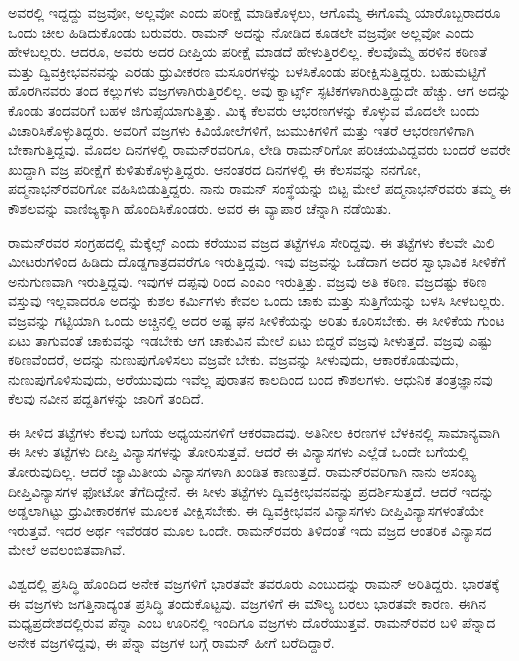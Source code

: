 ಅವರಲ್ಲಿ ಇದ್ದದ್ದು ವಜ್ರವೋ, ಅಲ್ಲವೋ ಎಂದು ಪರೀಕ್ಷೆ ಮಾಡಿಕೊಳ್ಳಲು, ಆಗೊಮ್ಮೆ ಈಗೊಮ್ಮೆ ಯಾರೊಬ್ಬರಾದರೂ ಒಂದು ಚೀಲ ಹಿಡಿದುಕೊಂಡು ಬರುವರು. ರಾಮನ್ ಅದನ್ನು ನೋಡಿದ ಕೂಡಲೇ ವಜ್ರವೋ ಅಲ್ಲವೋ ಎಂದು ಹೇಳಬಲ್ಲರು. ಆದರೂ, ಅವರು ಅದರ ದೀಪ್ತಿಯ ಪರೀಕ್ಷೆ ಮಾಡದೆ ಹೇಳುತ್ತಿರಲಿಲ್ಲ. ಕೆಲವೊಮ್ಮೆ ಹರಳಿನ ಕಠಿಣತೆ ಮತ್ತು ದ್ವಿವಕ್ರೀಭವನವನ್ನು ಎರಡು ಧ್ರುವೀಕರಣ ಮಸೂರಗಳನ್ನು ಬಳಸಿಕೊಂಡು ಪರೀಕ್ಷಿಸುತ್ತಿದ್ದರು. ಬಹುಮಟ್ಟಿಗೆ ಹೊರಗಿನವರು ತಂದ ಕಲ್ಲುಗಳು ವಜ್ರಗಳಾಗಿರುತ್ತಿರಲಿಲ್ಲ. ಅವು ಕ್ವಾರ್ಟ್ಸ್ ಸ್ಫಟಿಕಗಳಾಗಿರುತ್ತಿದ್ದುದೇ ಹೆಚ್ಚು. ಆಗ ಅದನ್ನು ಕೊಂಡು ತಂದವರಿಗೆ ಬಹಳ ಜಿಗುಪ್ಸೆಯಾಗುತ್ತಿತ್ತು. ಮಿಕ್ಕ ಕೆಲವರು ಆಭರಣಗಳನ್ನು ಕೊಳ್ಳುವ ಮೊದಲೇ ಬಂದು ವಿಚಾರಿಸಿಕೊಳ್ಳುತಿದ್ದರು. ಅವರಿಗೆ ವಜ್ರಗಳು ಕಿವಿಯೋಲೆಗಳಿಗೆ, ಜುಮುಕಿಗಳಿಗೆ ಮತ್ತು ಇತರೆ ಆಭರಣಗಳಿಗಾಗಿ ಬೇಕಾಗುತ್ತಿದ್ದವು. ಮೊದಲ ದಿನಗಳಲ್ಲಿ ರಾಮನ್‍ರವರಿಗೂ, ಲೇಡಿ ರಾಮನ್‍ರಿಗೋ ಪರಿಚಯವಿದ್ದವರು ಬಂದರೆ ಅವರೇ ಖುದ್ದಾಗಿ ವಜ್ರ ಪರೀಕ್ಷೆಗೆ ಕುಳಿತುಕೊಳ್ಳುತ್ತಿದ್ದರು. ಆನಂತರದ ದಿನಗಳಲ್ಲಿ ಈ ಕೆಲಸವನ್ನು ನನಗೋ, ಪದ್ಮನಾಭನ್‍ರವರಿಗೋ ವಹಿಸಿಬಿಡುತ್ತಿದ್ದರು. ನಾನು ರಾಮನ್ ಸಂಸ್ಥೆಯನ್ನು ಬಿಟ್ಟ ಮೇಲೆ ಪದ್ಮನಾಭನ್‍ರವರು ತಮ್ಮ ಈ ಕೌಶಲವನ್ನು ವಾಣಿಜ್ಯಕ್ಕಾಗಿ ಹೊಂದಿಸಿಕೊಂಡರು. ಅವರ ಈ ವ್ಯಾಪಾರ ಚೆನ್ನಾಗಿ ನಡೆಯಿತು.

ರಾಮನ್‍ರವರ ಸಂಗ್ರಹದಲ್ಲಿ ಮೆಕ್ಕೆಲ್ಸ್ ಎಂದು ಕರೆಯುವ ವಜ್ರದ ತಟ್ಟೆಗಳೂ ಸೇರಿದ್ದವು. ಈ ತಟ್ಟೆಗಳು ಕೆಲವೇ ಮಿಲಿ ಮೀಟರುಗಳಿಂದ ಹಿಡಿದು ದೊಡ್ಡಗಾತ್ರದವರೆಗೂ ಇರುತ್ತಿದ್ದವು. ಇವು ವಜ್ರವನ್ನು ಒಡೆದಾಗ ಅದರ ಸ್ವಾಭಾವಿಕ ಸೀಳಿಕೆಗೆ ಅನುಗುಣವಾಗಿ ಇರುತ್ತಿದ್ದವು. ಇವುಗಳ ದಪ್ಪವು  ರಿಂದ  ಎಂಎಂ ಇರುತ್ತಿತ್ತು. ವಜ್ರವು ಅತಿ ಕಠಿಣ. ವಜ್ರದಷ್ಟು ಕಠಿಣ ವಸ್ತುವು ಇಲ್ಲವಾದರೂ ಅದನ್ನು ಕುಶಲ ಕರ್ಮಿಗಳು ಕೇವಲ ಒಂದು ಚಾಕು ಮತ್ತು ಸುತ್ತಿಗೆಯನ್ನು ಬಳಸಿ ಸೀಳಬಲ್ಲರು. ವಜ್ರವನ್ನು ಗಟ್ಟಿಯಾಗಿ ಒಂದು ಅಚ್ಚಿನಲ್ಲಿ ಅದರ ಅಷ್ಟ ಘನ ಸೀಳಿಕೆಯನ್ನು ಅರಿತು ಕೂರಿಸಬೇಕು. ಈ ಸೀಳಿಕೆಯ ಗುಂಟ ಏಟು ತಾಗುವಂತೆ ಚಾಕುವನ್ನು ಇಡಬೇಕು ಆಗ ಚಾಕುವಿನ ಮೇಲೆ ಏಟು ಬಿದ್ದರೆ ವಜ್ರವು ಸೀಳುತ್ತದೆ. ವಜ್ರವು ಎಷ್ಟು ಕಠಿಣವೆಂದರೆ, ಅದನ್ನು ನುಣುಪುಗೊಳಿಸಲು ವಜ್ರವೇ ಬೇಕು. ವಜ್ರವನ್ನು ಸೀಳುವುದು, ಆಕಾರಕೊಡುವುದು, ನುಣುಪುಗೊಳಿಸುವುದು, ಅರೆಯುವುದು ಇವೆಲ್ಲ ಪುರಾತನ ಕಾಲದಿಂದ ಬಂದ ಕೌಶಲಗಳು. ಆಧುನಿಕ ತಂತ್ರಜ್ಞಾನವು ಕೆಲವು ನವೀನ ಪದ್ದತಿಗಳನ್ನು ಜಾರಿಗೆ ತಂದಿದೆ.

ಈ ಸೀಳಿದ ತಟ್ಟೆಗಳು ಕೆಲವು ಬಗೆಯ ಅಧ್ಯಯನಗಳಿಗೆ ಆಕರವಾದವು. ಅತಿನೀಲ ಕಿರಣಗಳ ಬೆಳಕಿನಲ್ಲಿ ಸಾಮಾನ್ಯವಾಗಿ ಈ ಸೀಳು ತಟ್ಟೆಗಳು ದೀಪ್ತಿ ವಿನ್ಯಾಸಗಳನ್ನು ತೋರಿಸುತ್ತವೆ. ಆದರೆ ಈ ವಿನ್ಯಾಸಗಳು ಎಲ್ಲೆಡೆ ಒಂದೇ ಬಗೆಯಲ್ಲಿ ತೋರುವುದಿಲ್ಲ. ಆದರೆ ಜ್ಯಾಮಿತೀಯ ವಿನ್ಯಾಸಗಳಾಗಿ ಖಂಡಿತ ಕಾಣುತ್ತದೆ. ರಾಮನ್‍ರವರಿಗಾಗಿ ನಾನು ಅಸಂಖ್ಯ ದೀಪ್ತಿವಿನ್ಯಾಸಗಳ ಫೋಟೋ ತೆಗೆದಿದ್ದೇನೆ. ಈ ಸೀಳು ತಟ್ಟೆಗಳು ದ್ವಿವಕ್ರೀಭವನವನ್ನು ಪ್ರದರ್ಶಿಸುತ್ತದೆ. ಆದರೆ ಇದನ್ನು ಅಡ್ಡಲಾಗಿಟ್ಟು ಧ್ರುವೀಕಾರಕಗಳ ಮೂಲಕ ವೀಕ್ಷಿಸಬೇಕು. ಈ ದ್ವಿವಕ್ರೀಭವನ ವಿನ್ಯಾಸಗಳು ದೀಪ್ತಿವಿನ್ಯಾಸಗಳಂತೆಯೇ ಇರುತ್ತವೆ. ಇದರ ಅರ್ಥ ಇವೆರಡರ ಮೂಲ ಒಂದೇ. ರಾಮನ್‍ರವರು ತಿಳಿದಂತೆ ಇದು ವಜ್ರದ ಆಂತರಿಕ ವಿನ್ಯಾಸದ ಮೇಲೆ ಅವಲಂಬಿತವಾಗಿವೆ.

ವಿಶ್ವದಲ್ಲಿ ಪ್ರಸಿದ್ಧಿ ಹೊಂದಿದ ಅನೇಕ ವಜ್ರಗಳಿಗೆ ಭಾರತವೇ ತವರೂರು ಎಂಬುದನ್ನು ರಾಮನ್ ಅರಿತಿದ್ದರು. ಭಾರತಕ್ಕೆ ಈ ವಜ್ರಗಳು ಜಗತ್ತಿನಾದ್ಯಂತ ಪ್ರಸಿದ್ಧಿ ತಂದುಕೊಟ್ಟವು. ವಜ್ರಗಳಿಗೆ ಈ ಮೌಲ್ಯ ಬರಲು ಭಾರತವೇ ಕಾರಣ. ಈಗಿನ ಮಧ್ಯಪ್ರದೇಶದಲ್ಲಿರುವ ಪೆನ್ನಾ ಎಂಬ ಊರಿನಲ್ಲಿ ಇಂದಿಗೂ ವಜ್ರಗಳು ದೊರೆಯುತ್ತವೆ. ರಾಮನ್‍ರವರ ಬಳಿ ಪೆನ್ನಾದ ಅನೇಕ ವಜ್ರಗಳಿದ್ದವು, ಈ ಪೆನ್ನಾ ವಜ್ರಗಳ ಬಗ್ಗೆ ರಾಮನ್ ಹೀಗೆ ಬರೆದಿದ್ದಾರೆ.

